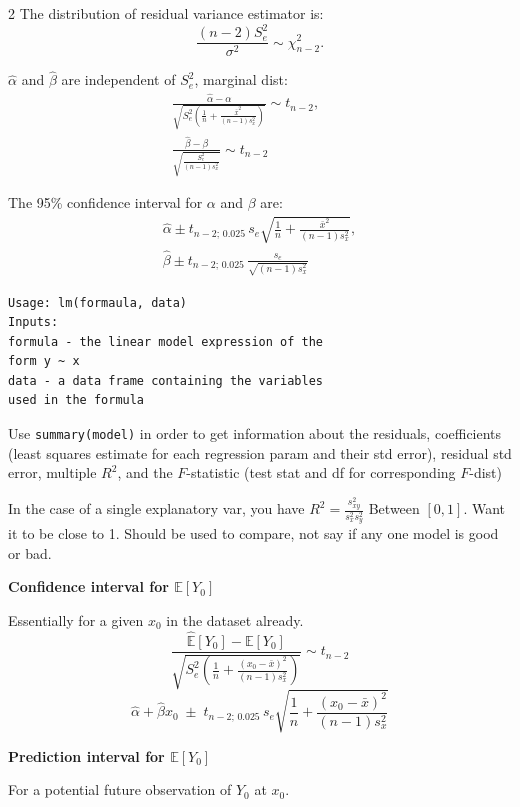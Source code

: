 \documentclass[10pt]{extarticle}
\theoremstyle{definition}
\theoremstyle{remark}
\newcommand{\E}{\mathbb{E}}
\begin{document}
\begin{multicols}{2}
    The distribution of residual variance estimator is: 
    \[ \frac{(n-2)S_e^2}{\sigma^2} \sim \chi^2_{n-2}. \]
 
    $\hat{\alpha}$ and $\hat{\beta}$ are independent of $S^2_e$, marginal dist: 
    \begin{gather*}
        \frac{\hat{\alpha} - \alpha}{\sqrt{S_e^2\!\left(\frac{1}{n} + \frac{\bar{x}^2}{(n-1)s_x^2}\right)}} \sim t_{n-2}, \qquad \\
        \frac{\hat{\beta} - \beta}{\sqrt{\frac{S_e^2}{(n-1)s_x^2}}} \sim t_{n-2} 
    \end{gather*}

    The 95\% confidence interval for $\alpha$ and $\beta$ are: 
    \begin{gather*}
        \hat{\alpha} \pm t_{n-2;\,0.025}\,s_e\sqrt{\frac{1}{n} + \frac{\bar{x}^2}{(n-1)s_x^2}}, \\
        \hat{\beta} \pm t_{n-2;\,0.025}\,\frac{s_e}{\sqrt{(n-1)s_x^2}}
    \end{gather*}

    \begin{verbatim}
Usage: lm(formaula, data)
Inputs: 
formula - the linear model expression of the 
form y ~ x
data - a data frame containing the variables 
used in the formula
    \end{verbatim}
    Use \verb|summary(model)| in order to get information about the 
    residuals, coefficients (least squares estimate for each regression
    param and their std error), residual std error, multiple $R^2$, and the 
    $F$-statistic (test stat and df for corresponding $F$-dist)
    
    In the case of a single explanatory var, you have $R^2 = \frac{s^2_{xy}}{s^2_x s^2_y}$
    Between $[0, 1]$. Want it to be close to 1. Should be used to compare, not say 
    if any one model is good or bad. 

    \noindent
    \textbf{Confidence interval for $\E[Y_0]$}

    Essentially for a given $x_0$ in the dataset already. 
    \[ \frac{\hat{\E}[Y_0] - \E[Y_0]}{\sqrt{S^2_e \left( \frac{1}{n} + \frac{(x_0 - \bar{x})^2}{(n-1)s_x^2}\right)}} \sim t_{n-2} \]
    \[ \hat{\alpha} + \hat{\beta}x_0 \;\pm\; t_{n-2;\,0.025}\,s_e\sqrt{\frac{1}{n} + \frac{(x_0-\bar{x})^2}{(n-1)s_x^2}} \]

    \noindent
    \textbf{Prediction interval for $\E[Y_0]$}

    For a potential future observation of $Y_0$ at $x_0$. 
    

\end{multicols}
\end{document}
